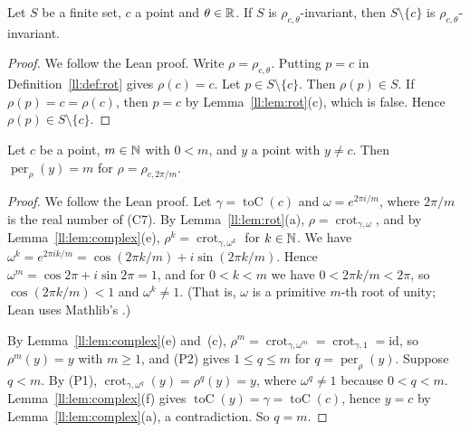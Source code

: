 \begin{lemma}\label{ll:lem:erase}
Let $S$ be a finite set, $c$ a point and $\theta\in\mathbb R$. If $S$ is $\rho_{c,\theta}$-invariant, then $S\setminus\{c\}$
is $\rho_{c,\theta}$-invariant.
\end{lemma}

\begin{proof}
We follow the Lean proof. Write $\rho=\rho_{c,\theta}$. Putting $p=c$ in Definition~\ref{ll:def:rot} gives $\rho(c)=c$.
Let $p\in S\setminus\{c\}$. Then $\rho(p)\in S$. If $\rho(p)=c=\rho(c)$, then $p=c$ by Lemma~\ref{ll:lem:rot}(c), which
is false. Hence $\rho(p)\in S\setminus\{c\}$.
\end{proof}

\begin{lemma}\label{ll:lem:minperiod}
Let $c$ be a point, $m\in\mathbb N$ with $0<m$, and $y$ a point with $y\ne c$. Then
$\operatorname{per}_{\rho}(y)=m$ for $\rho=\rho_{c,2\pi/m}$.
\end{lemma}

\begin{proof}
We follow the Lean proof. Let $\gamma=\operatorname{toC}(c)$ and $\omega=e^{2\pi i/m}$, where $2\pi/m$ is the real
number of (C7). By Lemma~\ref{ll:lem:rot}(a), $\rho=\operatorname{crot}_{\gamma,\omega}$, and by
Lemma~\ref{ll:lem:complex}(e), $\rho^k=\operatorname{crot}_{\gamma,\omega^k}$ for $k\in\mathbb N$. We have
$\omega^k=e^{2\pi ik/m}=\cos(2\pi k/m)+i\sin(2\pi k/m)$. Hence $\omega^m=\cos2\pi+i\sin2\pi=1$, and for $0<k<m$ we have
$0<2\pi k/m<2\pi$, so $\cos(2\pi k/m)<1$ and $\omega^k\ne1$. (That is, $\omega$ is a primitive $m$-th root of unity;
Lean uses Mathlib's .)

By Lemma~\ref{ll:lem:complex}(e) and~(c),
$\rho^m=\operatorname{crot}_{\gamma,\omega^m}=\operatorname{crot}_{\gamma,1}=\mathrm{id}$, so $\rho^m(y)=y$ with $m\ge1$, and
(P2) gives $1\le q\le m$ for $q=\operatorname{per}_\rho(y)$. Suppose $q<m$. By (P1), $\operatorname{crot}_{\gamma,
\omega^q}(y)=\rho^q(y)=y$, where $\omega^q\ne1$ because $0<q<m$. Lemma~\ref{ll:lem:complex}(f) gives
$\operatorname{toC}(y)=\gamma=\operatorname{toC}(c)$, hence $y=c$ by Lemma~\ref{ll:lem:complex}(a), a contradiction.
So $q=m$.
\end{proof}

